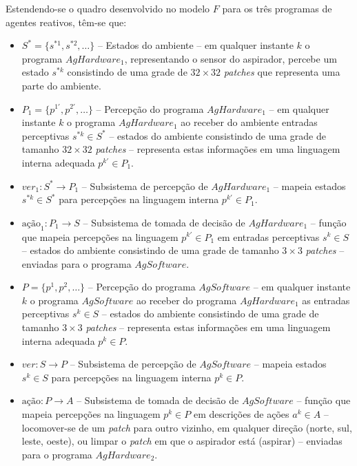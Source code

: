 Estendendo-se o quadro desenvolvido no modelo $F$ para os três programas de agentes reativos, têm-se que:
\begin{itemize}
    \item $S^* = \{s^{*1}, s^{*2}, \ldots\}$ -- Estados do ambiente – em qualquer instante $k$ o programa $AgHardware_1$, representando o sensor do aspirador, percebe um estado $s^{*k}$ consistindo de uma grade de $32 \times 32$ \textit{patches} que representa uma parte do ambiente.
    
    \item $P_1 = \{p^{1\prime}, p^{2\prime}, \ldots \}$ -- Percepção do programa $AgHardware_1$ – 
    em qualquer instante $k$ o programa $AgHardware_1$ ao receber do ambiente entradas perceptivas $s^{*k} \in S^*$ – estados do 
    ambiente consistindo de uma grade de tamanho $32 \times 32$ 
    \textit{patches} – representa estas informações em uma linguagem interna adequada $p^{k\prime} \in P_1$.
    
    \item $ver_1: S^*  \rightarrow P_1$ --	Subsistema de percepção de $AgHardware_1$ – mapeia estados $s^{*k} \in S^*$ para percepções na linguagem interna $p^{k\prime} \in P_1$.
    
    \item $\textrm{ação}_1: P_1 \rightarrow S$ -- Subsistema de tomada de decisão de $AgHardware_1$ – função que mapeia percepções na linguagem $p^{k\prime} \in P_1$ em entradas perceptivas $s^k \in S$ – estados do ambiente consistindo de uma grade de tamanho $3 \times 3$ \textit{patches} – enviadas para o programa $AgSoftware$.
    
    \item $P = \{p^1, p^2, \ldots \}$ -- Percepção do programa $AgSoftware$ – em qualquer instante $k$ o programa $AgSoftware$ ao receber do programa $AgHardware_1$ as entradas perceptivas $s^k \in S$ – estados do ambiente consistindo de uma grade de tamanho $3 \times 3$ \textit{patches} – representa estas informações em uma linguagem interna adequada $p^k \in P$.
    
    \item $ver: S  \rightarrow P$ -- Subsistema de percepção de $AgSoftware$ – mapeia estados $s^k \in S$ para percepções na linguagem interna $p^k \in P$.
    
    \item $\textrm{ação}: P \rightarrow A$ -- Subsistema de tomada de decisão de $AgSoftware$ – função que mapeia percepções na linguagem $p^k \in P$ em descrições de ações $a^k \in A$ – locomover-se de um \textit{patch} para outro vizinho, em qualquer direção (norte, sul, leste, oeste), ou limpar o \textit{patch} em que o aspirador está (aspirar) – enviadas para o programa $AgHardware_2$.
    

\end{itemize}
